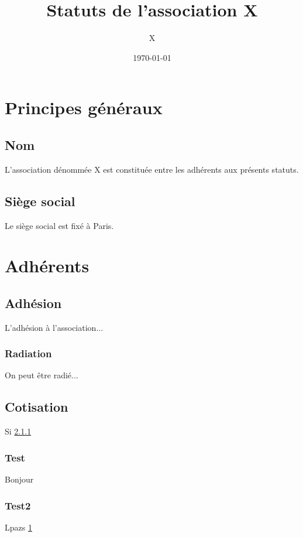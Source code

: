 \documentclass[a4paper]{article}
\title{Statuts de l'association X}
\author{X}
\date{\today}
\begin{document}
\maketitle
\section{Principes généraux} \label{titre-principesg}
    \subsection{Nom} \label{article-nom}
        L'association dénommée X est constituée entre les adhérents aux présents statuts.

    \subsection{Siège social}
        Le siège social est fixé à Paris.

\section{Adhérents}
    \subsection{Adhésion}
        L'adhésion à l'association...
        \subsubsection{Radiation} \label{section-radiation}
            On peut être radié...
    \subsection{Cotisation}
        Si \cref{section-radiation}
        \subsubsection{Test}
            Bonjour
        \subsubsection{Test2}
            Lpazs \cref{titre-principesg}
\end{document}
